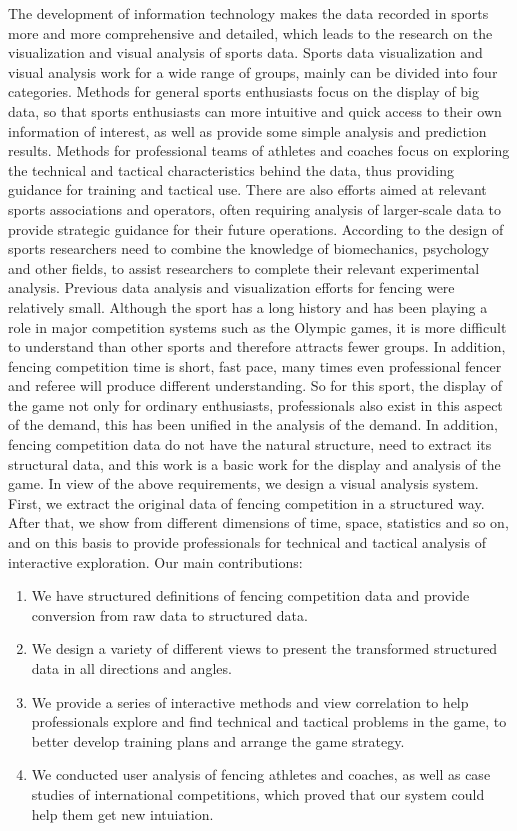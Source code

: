 \documentclass[journal]{vgtc}                %
\begin{document}
The development of information technology makes the data recorded in sports more and more comprehensive and detailed, which leads to the research on the visualization and visual analysis of sports data.
Sports data visualization and visual analysis work for a wide range of groups, mainly can be divided into four categories.
Methods for general sports enthusiasts focus on the display of big data, so that sports enthusiasts can more intuitive and quick access to their own information of interest, as well as provide some simple analysis and prediction results.
Methods for professional teams of athletes and coaches focus on exploring the technical and tactical characteristics behind the data, thus providing guidance for training and tactical use.
There are also efforts aimed at relevant sports associations and operators, often requiring analysis of larger-scale data to provide strategic guidance for their future operations.
According to the design of sports researchers need to combine the knowledge of biomechanics, psychology and other fields, to assist researchers to complete their relevant experimental analysis.
Previous data analysis and visualization efforts for fencing were relatively small.
Although the sport has a long history and has been playing a role in major competition systems such as the Olympic games, it is more difficult to understand than other sports and therefore attracts fewer groups.
In addition, fencing competition time is short, fast pace, many times even professional fencer and referee will produce different understanding.
So for this sport, the display of the game not only for ordinary enthusiasts, professionals also exist in this aspect of the demand, this has been unified in the analysis of the demand.
In addition, fencing competition data do not have the natural structure, need to extract its structural data, and this work is a basic work for the display and analysis of the game.
In view of the above requirements, we design a visual analysis system.
First, we extract the original data of fencing competition in a structured way.
After that, we show from different dimensions of time, space, statistics and so on, and on this basis to provide professionals for technical and tactical analysis of interactive exploration.
Our main contributions:
\begin{enumerate}
	\item We have structured definitions of fencing competition data and provide conversion from raw data to structured data.
	\item We design a variety of different views to present the transformed structured data in all directions and angles.
	\item We provide a series of interactive methods and view correlation to help professionals explore and find technical and tactical problems in the game, to better develop training plans and arrange the game strategy.
	\item We conducted user analysis of fencing athletes and coaches, as well as case studies of international competitions, which proved that our system could help them get new intuiation.
\end{enumerate}
\end{document}
